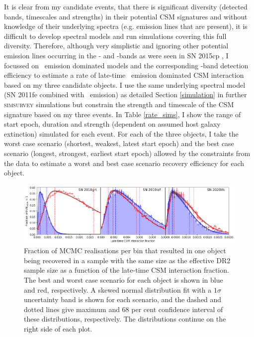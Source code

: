 \documentclass[a4paper,oneside,12pt, class=Latex/Classes/PhDthesisPSnPDF, crop=false]{standalone}
\begin{document}
It is clear from my candidate events, that there is significant diversity (detected bands, timescales and strengths) in their potential CSM signatures and without knowledge of their underlying spectra (e.g. emission lines that are present), it is difficult to develop spectral models and run simulations covering this full diversity. Therefore, although very simplistic and ignoring other potential emission lines occurring in the \ztfg- and \ztfi-bands as were seen in SN 2015cp \citep{2015cp}, I focussed on \Halpha~emission dominated models and the corresponding \ztfr-band detection efficiency to estimate a rate of late-time \Halpha~emission dominated CSM interaction based on my three candidate objects. I use the same underlying spectral model (SN 2011fe combined with \Halpha~emission) as detailed Section \ref{simulation} in further \textsc{simsurvey} simulations but constrain the strength and timescale of the CSM signature based on my three events. In Table \ref{rate_sims}, I show the range of start epoch, duration and strength (dependent on assumed host galaxy extinction) simulated for each event. For each of the three objects, I take the worst case scenario (shortest, weakest, latest start epoch) and the best case scenario (longest, strongest, earliest start epoch) allowed by the constraints from the data to estimate a worst and best case scenario recovery efficiency for each object.


\begin{figure}
 \centering
 \includegraphics[width=\textwidth]{../Images/chapter_3/rateplots.png}
 \caption{Fraction of MCMC realisations per bin that resulted in one object being recovered in a sample with the same size as the effective DR2 sample size as a function of the late-time CSM interaction fraction. The best and worst case scenario for each object is shown in blue and red, respectively. A skewed normal distribution fit with a $1 \sigma$ uncertainty band is shown for each scenario, and the dashed and dotted lines give maximum and 68 per cent confidence interval of these distributions, respectively. The distributions continue on the right side of each plot.}
 \label{rate_fig}
\end{figure}
\end{document}
